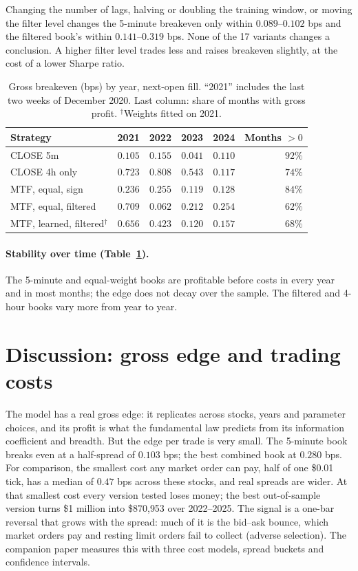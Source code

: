 \documentclass[11pt,a4paper]{article}
\begin{document}
Changing the number of lags, halving or doubling the training window, or moving the filter level changes
the 5-minute breakeven only within $0.089$--$0.102$ bps and the filtered book's within
$0.141$--$0.319$ bps. None of the 17 variants changes a conclusion. A higher filter level
trades less and raises breakeven slightly, at the cost of a lower Sharpe ratio.

\begin{table}[htbp]
\centering
\caption{Gross breakeven (bps) by year, next-open fill. ``2021'' includes the last two weeks of December
2020. Last column: share of months with gross profit. $^{\dagger}$Weights fitted on 2021.}
\label{tab:year}
\small
\begin{tabular}{@{}lrrrrr@{}}
\toprule
Strategy & 2021 & 2022 & 2023 & 2024 & Months $>0$ \\
\midrule
CLOSE 5m & $0.105$ & $0.155$ & $0.041$ & $0.110$ & $92\%$ \\
CLOSE 4h only & $0.723$ & $0.808$ & $0.543$ & $0.117$ & $74\%$ \\
MTF, equal, sign & $0.236$ & $0.255$ & $0.119$ & $0.128$ & $84\%$ \\
MTF, equal, filtered & $0.709$ & $0.062$ & $0.212$ & $0.254$ & $62\%$ \\
MTF, learned, filtered$^{\dagger}$ & $0.656$ & $0.423$ & $0.120$ & $0.157$ & $68\%$ \\
\bottomrule
\end{tabular}
\end{table}

\paragraph{Stability over time (Table~\ref{tab:year}).} The 5-minute and equal-weight books are profitable
before costs in every year and in most months; the edge does not decay over the sample. The filtered and
4-hour books vary more from year to year.

\section{Discussion: gross edge and trading costs}
\label{sec:discussion}

The model has a real gross edge: it replicates across stocks, years and parameter choices, and its
profit is what the fundamental law predicts from its information coefficient and breadth. But the edge
per trade is very small. The 5-minute book breaks even at a half-spread of $0.103$ bps; the best combined
book at $0.280$ bps. For comparison, the smallest cost any market order can pay, half of one \$0.01
tick, has a median of $0.47$ bps across these stocks, and real spreads are wider. At that smallest
cost every version tested loses money; the best out-of-sample version turns \$1 million into
\$870{,}953 over 2022--2025. The signal is a one-bar reversal that grows with the spread: much of it is
the bid--ask bounce, which market orders pay and resting limit orders fail to collect (adverse selection).
The companion paper measures this with three cost models, spread buckets and confidence intervals.
\end{document}
